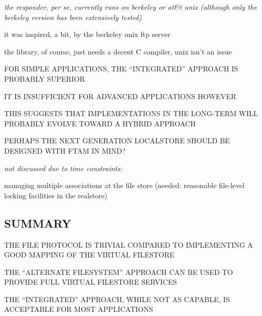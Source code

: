 \begin{note}\em
the responder, per se, currently runs on berkeley or at\&t unix
(although only the berkeley version has been extensively tested)

it was inspired, a bit, by the berkeley unix ftp server

the library, of course, just needs a decent C compiler, unix isn't an issue
\end{note}


\begin{bwslide}

\begin{nrtc}
\item	FOR SIMPLE APPLICATIONS, THE ``INTEGRATED'' APPROACH IS PROBABLY
	SUPERIOR

\item	IT IS INSUFFICIENT FOR ADVANCED APPLICATIONS HOWEVER

\item	THIS SUGGESTS THAT IMPLEMENTATIONS IN THE LONG-TERM WILL PROBABLY
	EVOLVE TOWARD A HYBRID APPROACH

\item	PERHAPS THE NEXT GENERATION LOCALSTORE SHOULD BE DESIGNED WITH FTAM
	IN MIND?
\end{nrtc}
\end{bwslide}


\begin{note}\em
not discussed due to time constraints:

managing multiple associations at the file store
(needed: reasonable file-level locking facilities in the realstore)
\end{note}


\begin{bwslide}
\part*	{SUMMARY}\bf

\begin{nrtc}
\item	THE FILE PROTOCOL IS TRIVIAL COMPARED TO IMPLEMENTING A GOOD MAPPING
	OF THE VIRTUAL FILESTORE

\item	THE ``ALTERNATE FILESYSTEM'' APPROACH CAN BE USED TO PROVIDE FULL
	VIRTUAL FILESTORE SERVICES

\item	THE ``INTEGRATED'' APPROACH, WHILE NOT AS CAPABLE, IS ACCEPTABLE FOR
	MOST APPLICATIONS
\end{nrtc}
\end{bwslide}

